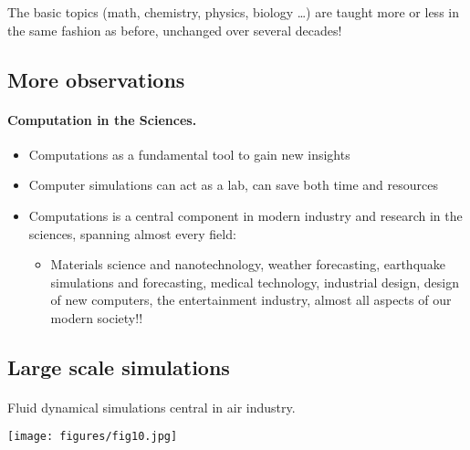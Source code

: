 \documentclass[%
twoside,                 %
final,                   %
10pt]{article}
\begin{document}
\noindent
The basic topics (math, chemistry, physics, biology \dots) are taught more or less in the same fashion as before, unchanged over several decades!




\subsection{More observations}

\paragraph{Computation in the Sciences.}

\begin{itemize}
\item Computations as a fundamental tool  to gain new insights

\item Computer simulations can act as  a lab, can save both time and resources 

\item Computations is a central component in modern industry and research in the sciences, spanning almost every field:
\begin{itemize}

 \item Materials science and nanotechnology, weather forecasting, earthquake simulations and forecasting, medical technology, industrial design, design of new computers, the entertainment industry, almost all aspects of our modern society!!
\end{itemize}

\noindent
\end{itemize}

\noindent




\subsection{Large scale simulations}

\paragraph{}
Fluid dynamical simulations central in air industry.


\centerline{\texttt{[image: figures/fig10.jpg]}}
\end{document}
